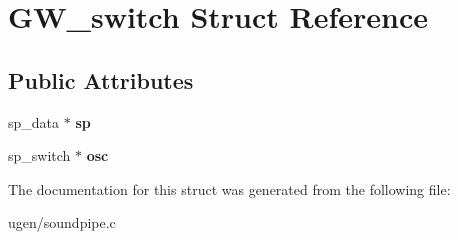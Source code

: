 \hypertarget{structGW__switch}{}\section{G\+W\+\_\+switch Struct Reference}
\label{structGW__switch}
\subsection*{Public Attributes}
\begin{DoxyCompactItemize}
\item 
\hypertarget{structGW__switch_ad9c1140ee82616ff76472580fb60c681}{}\label{structGW__switch_ad9c1140ee82616ff76472580fb60c681} 
sp\+\_\+data $\ast$ {\bfseries sp}
\item 
\hypertarget{structGW__switch_a2824469de28fb0a6fe864721a3aba66b}{}\label{structGW__switch_a2824469de28fb0a6fe864721a3aba66b} 
sp\+\_\+switch $\ast$ {\bfseries osc}
\end{DoxyCompactItemize}


The documentation for this struct was generated from the following file\+:\begin{DoxyCompactItemize}
\item 
ugen/soundpipe.\+c\end{DoxyCompactItemize}
